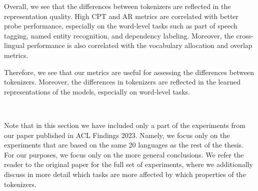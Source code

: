 Overall, we see that the differences between tokenizers are reflected in the representation quality. High CPT and AR metrics are correlated with better probe performance, especially on the word-level tasks such as part of speech tagging, named entity recognition, and dependency labeling. Moreover, the cross-lingual performance is also correlated with the vocabulary allocation and overlap metrics. 

Therefore, we see that our metrics are useful for assessing the differences between tokenizers. Moreover, the differences in tokenizers are reflected in the learned representations of the models, especially on word-level tasks.

~

Note that in this section we have included only a part of the experiments from our paper \citet{limisiewicz_tokenization_2023} published in ACL Findings 2023. Namely, we focus only on the experiments that are based on the same 20 languages as the rest of the thesis. For our purposes, we focus only on the more general conclusions. We refer the reader to the original paper for the full set of experiments, where we additionally discuss in more detail which tasks are more affected by which properties of the tokenizers.







